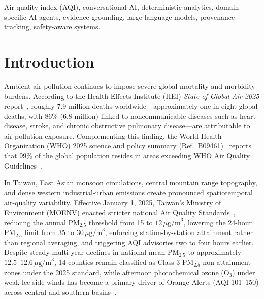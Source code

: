 \documentclass[conference]{IEEEtran}
\begin{document}
\begin{IEEEkeywords}
Air quality index (AQI), conversational AI, deterministic analytics, domain-specific AI agents, evidence grounding, large language models, provenance tracking, safety-aware systems.
\end{IEEEkeywords}

\section{Introduction}
Ambient air pollution continues to impose severe global mortality and morbidity burdens. According to the Health Effects Institute (HEI) \emph{State of Global Air 2025} report~\cite{hei2025soga}, roughly 7.9 million deaths worldwide---approximately one in eight global deaths, with 86\% (6.8 million) linked to noncommunicable diseases such as heart disease, stroke, and chronic obstructive pulmonary disease---are attributable to air pollution exposure. Complementing this finding, the World Health Organization (WHO) 2025 science and policy summary (Ref.~B09461)~\cite{who2025summary} reports that 99\% of the global population resides in areas exceeding WHO Air Quality Guidelines~\cite{who2021guidelines}.

In Taiwan, East Asian monsoon circulations, central mountain range topography, and dense western industrial-urban emissions create pronounced spatiotemporal air-quality variability. Effective January 1, 2025, Taiwan's Ministry of Environment (MOENV) enacted stricter national Air Quality Standards~\cite{moenv2025standards}, reducing the annual $\text{PM}_{2.5}$ threshold from 15 to $12\,\mu\text{g/m}^3$, lowering the 24-hour $\text{PM}_{2.5}$ limit from 35 to $30\,\mu\text{g/m}^3$, enforcing station-by-station attainment rather than regional averaging, and triggering AQI advisories two to four hours earlier. Despite steady multi-year declines in national mean $\text{PM}_{2.5}$ to approximately $12.5\text{--}12.6\,\mu\text{g/m}^3$, 14 counties remain classified as Class-3 $\text{PM}_{2.5}$ non-attainment zones under the 2025 standard, while afternoon photochemical ozone ($\text{O}_3$) under weak lee-side winds has become a primary driver of Orange Alerts (AQI 101--150) across central and southern basins~\cite{moenv2025standards,moenv2025ozone}.
\end{document}
